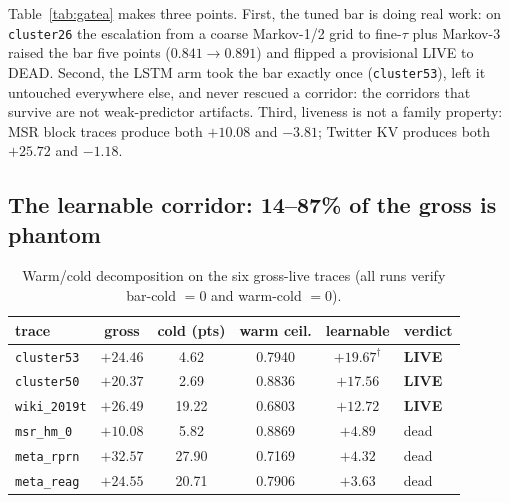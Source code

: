 \documentclass[11pt]{article}
\begin{document}
Table~\ref{tab:gatea} makes three points. First, the tuned bar is doing real work: on \texttt{cluster26} the escalation from a coarse Markov-1/2 grid to fine-$\tau$ plus Markov-3 raised the bar five points ($0.841{\to}0.891$) and flipped a provisional LIVE to DEAD. Second, the LSTM arm took the bar exactly once (\texttt{cluster53}), left it untouched everywhere else, and never rescued a corridor: the corridors that survive are not weak-predictor artifacts. Third, liveness is not a family property: MSR block traces produce both $+10.08$ and $-3.81$; Twitter KV produces both $+25.72$ and $-1.18$.

\subsection{The learnable corridor: 14--87\% of the gross is phantom}\label{sec:learnable}
\begin{table}[t]\centering\footnotesize
\setlength{\tabcolsep}{4pt}
\caption{Warm/cold decomposition on the six gross-live traces (all runs verify bar-cold $=0$ and warm-cold $=0$).}
\label{tab:learnable}
\begin{tabular}{lccccl}
\toprule
trace & gross & cold (pts) & warm ceil. & \textbf{learnable} & verdict \\
\midrule
\texttt{cluster53} & $+24.46$ & 4.62 & 0.7940 & $\mathbf{+19.67}^{\dagger}$ & \textbf{LIVE} \\
\texttt{cluster50} & $+20.37$ & 2.69 & 0.8836 & $\mathbf{+17.56}$ & \textbf{LIVE} \\
\texttt{wiki\_2019t} & $+26.49$ & 19.22 & 0.6803 & $\mathbf{+12.72}$ & \textbf{LIVE} \\
\texttt{msr\_hm\_0} & $+10.08$ & 5.82 & 0.8869 & $+4.89$ & dead \\
\texttt{meta\_rprn} & $+32.57$ & 27.90 & 0.7169 & $+4.32$ & dead \\
\texttt{meta\_reag} & $+24.55$ & 20.71 & 0.7906 & $+3.63$ & dead \\
\bottomrule
\end{tabular}
\end{table}
\end{document}
